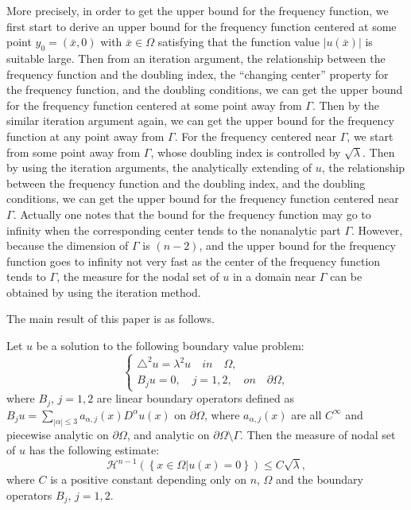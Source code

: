 \documentclass[a4paper, 12pt, onecolumn]{article} \textwidth 148mm
\begin{document}
More precisely, in order to get the upper bound for the frequency function, we first start to derive an upper bound for the frequency function centered at some point $y_0=(\bar{x},0)$ with $\bar{x}\in\Omega$ satisfying that the function value $|u(\bar{x})|$ is suitable large. Then from an iteration argument, the relationship between the frequency function and the doubling index, the ``changing center'' property for the frequency function, and the doubling conditions, we can get the upper bound for the frequency function centered at some point away from $\Gamma$. Then by the similar iteration argument again, we can get the upper bound for the frequency function at any point away from $\Gamma$.
For the frequency centered near $\Gamma$, we start from some point away from $\Gamma$, whose doubling index is controlled by $\sqrt{\lambda}$. Then by using the iteration arguments, the analytically extending of $u$, the relationship between the frequency function and the doubling index, and the doubling conditions, we can get the upper bound for the frequency function centered near $\Gamma$.
Actually one notes that the bound for the frequency function may go to infinity when the corresponding center tends to the nonanalytic part $\Gamma$. However, because the dimension of $\Gamma$ is $(n-2)$, and the upper bound for the frequency function goes to infinity not very fast as the center of the frequency function tends to $\Gamma$, the measure for the nodal set of $u$ in a domain near $\Gamma$ can be obtained by using the iteration method.

The main result of this paper is as follows.
\begin{theorem}
Let $u$ be a solution to the following boundary value problem:
\begin{equation}
\begin{cases}
\triangle^2u=\lambda^2u\quad in\quad\Omega,\\
B_ju=0,\quad j=1,2,\quad on\quad\partial\Omega,
\end{cases}
\end{equation}
where $B_j$, $j=1,2$ are linear boundary operators defined as $B_ju=\sum\limits_{|\alpha|\leq3}a_{\alpha,j}(x)D^{\alpha}u(x)$ on $\partial\Omega$, where $a_{\alpha,j}(x)$ are all $C^{\infty}$ and piecewise analytic on $\partial\Omega$, and analytic on $\partial\Omega\setminus\Gamma$.  Then the measure of nodal set of $u$ has the following estimate:
\begin{equation}
\mathcal{H}^{n-1}\left(\left\{x\in\Omega|u(x)=0\right\}\right)\leq C\sqrt{\lambda},
\end{equation}
where $C$ is a positive constant depending only on $n$, $\Omega$ and the boundary operators $B_j$, $j=1,2$.
\end{theorem}
\end{document}

